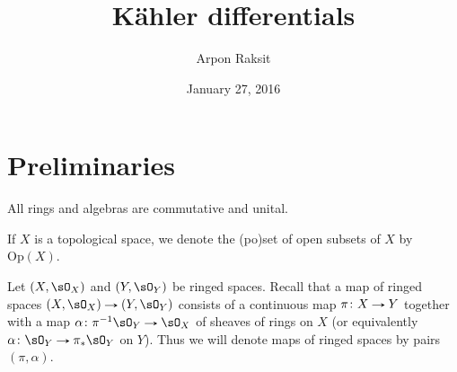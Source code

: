 

\title{K\"ahler differentials}
\author{Arpon Raksit}
\date{January 27, 2016}



\maketitle

\newcommand{\Der}{\mathrm{Der}}
\newcommand{\Mod}{\mathrm{Mod}}
\newcommand{\Alg}{\mathrm{Alg}}
\newcommand{\Set}{\mathrm{Set}}
\renewcommand{\Top}{\mathrm{Top}}
\newcommand{\pre}{\mathrm{pre}}
\newcommand{\Op}{\mathrm{Op}}


\section{Preliminaries}

\begin{convention}
  \label{rings-commutative}
  All rings and algebras are commutative and unital.
\end{convention}

\begin{notation}
  \label{open-poset}
  If $X$ is a topological space, we denote the (po)set of open subsets of $X$ by $\Op(X)$.
\end{notation}

\begin{notation}
  \label{locring-maps}
  Let $(X,\sO_X)$ and $(Y,\sO_Y)$ be ringed spaces. Recall that a map of ringed spaces $(X,\sO_X) \to (Y,\sO_Y)$ consists of a continuous map $\pi \c X \to Y$ together with a map $\alpha \c \pi^{-1}\sO_Y \to \sO_X$ of sheaves of rings on $X$ (or equivalently $\alpha \c \sO_Y \to \pi_*\sO_Y$ on $Y$). Thus we will denote maps of ringed spaces by pairs $(\pi,\alpha)$.
\end{notation}

